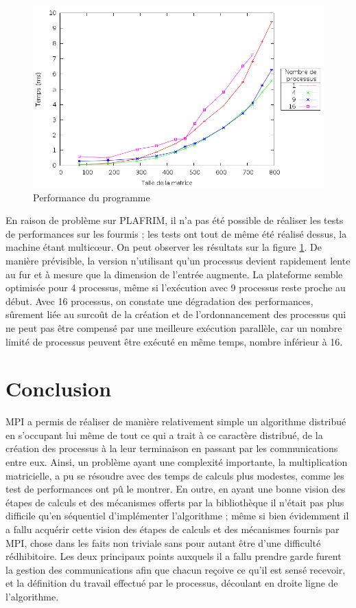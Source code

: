 \documentclass[a4paper,11pt]{article}
\begin{document}
\begin{figure}[h!]
  \centering
  \includegraphics[width=\textwidth]{plot.png}
  \caption{Performance du programme}
  \label{perf}
\end{figure}

En raison de problème sur PLAFRIM, il n'a pas été possible de réaliser les tests de performances sur les fourmis ; les tests ont tout de même été réalisé dessus, la machine étant multicœur. On peut observer les résultats sur la figure \ref{perf}. De manière prévisible, la version n'utilisant qu'un processus devient rapidement lente au fur et à mesure que la dimension de l'entrée augmente. La plateforme semble optimisée pour 4 processus, même si l'exécution avec 9 processus reste proche au début. Avec 16 processus, on constate une dégradation des performances, sûrement liée au surcoût de la création et de l'ordonnancement des processus qui ne peut pas être compensé par une meilleure exécution parallèle, car un nombre limité de processus peuvent être exécuté en même temps, nombre inférieur à 16.
\section{Conclusion}

MPI a permis de réaliser de manière relativement simple un algorithme distribué en s'occupant lui même de tout ce qui a trait à ce caractère distribué, de la création des processus à la leur terminaison en passant par les communications entre eux. Ainsi, un problème ayant une complexité importante, la multiplication matricielle, a pu se résoudre avec des temps de calculs plus modestes, comme les test de performances ont pû le montrer. En outre, en ayant une bonne vision des étapes de calculs et des mécanismes offerts par la bibliothèque il n'était pas plus difficile qu'en séquentiel d'implémenter l'algorithme ; même si bien évidemment il a fallu acquérir cette vision des étapes de calculs et des mécanismes fournis par MPI, chose dans les faits non triviale sans pour autant être d'une difficulté rédhibitoire. Les deux principaux points auxquels il a fallu prendre garde furent la gestion des communications afin que chacun reçoive ce qu'il est sensé recevoir, et la définition du travail effectué par le processus, découlant en droite ligne de l'algorithme.
\end{document}

